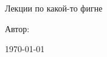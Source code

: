 \documentclass[a4paper,12pt]{article}
\begin{document}
\begin{titlepage}
    \centering
    \vspace*{5cm}
    {\LARGE Лекции по какой-то фигне\par}
    \vspace{2cm}
    {\large Автор: \par}
    \vfill
    {\large \today}
\end{titlepage}

\tableofcontents
\clearpage



\end{document}

